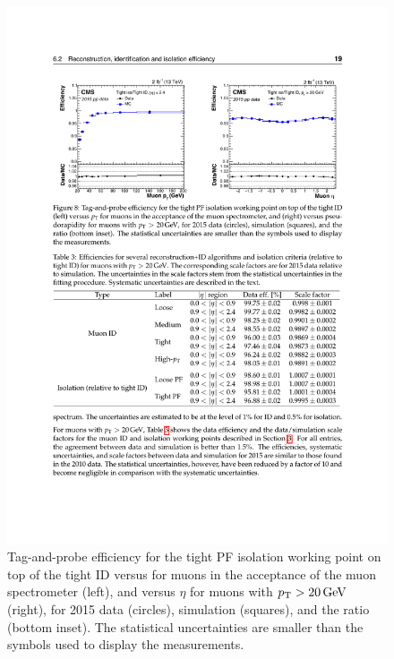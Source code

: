 \begin{figure}\centering
    \includegraphics[width=\textwidth]{figure/reco_muon_eff.pdf}
    \caption[Tag-and-probe muon efficiency for the tight PF isolation working point on top of the tight ID]{
        Tag-and-probe efficiency for the tight PF isolation working point on top of the tight ID versus \PT for muons in the acceptance of the muon spectrometer (left), and versus $\eta$ for muons with $p_{\mathrm{T}} > 20 \,\text{Ge\hspace{-.08em}V}$ (right), for 2015 data (circles), simulation (squares), and the ratio (bottom inset).
        The statistical uncertainties are smaller than the symbols used to display the measurements.
    }
    \label{fig:reco_muon_eff}
\end{figure}


